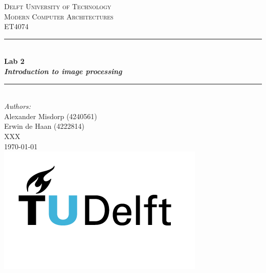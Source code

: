 \documentclass{article}
\begin{document}
\begin{titlepage}

\newcommand{\HRule}{\rule{\linewidth}{0.5mm}}
\newcommand{\tab}[1]{\hspace{.2\textwidth}\rlap{#1}}
\center

\textsc{\LARGE Delft University of Technology}\\[1.5cm]
\textsc{\large Modern Computer Architectures}\\[0.5cm] 
\textsc{\large ET4074}\\[0.5cm]

\HRule \\[0.5cm]
{ \huge \bfseries Lab 2}\\[0.4cm]
{ \Large \itshape \bfseries Introduction to image
processing} \\ [0.3cm]
\HRule \\[1.5cm]

\Large \emph{Authors:}\\
Alexander Misdorp (4240561) \\
Erwin de Haan (4222814)\\
XXX\\[2.8cm]

{\large \today}\\[2cm]

\includegraphics[scale=0.27]{images/TU_Delft_logo_RGB.png}\\%

\vfill %

\end{titlepage}








%
%
\end{document}
